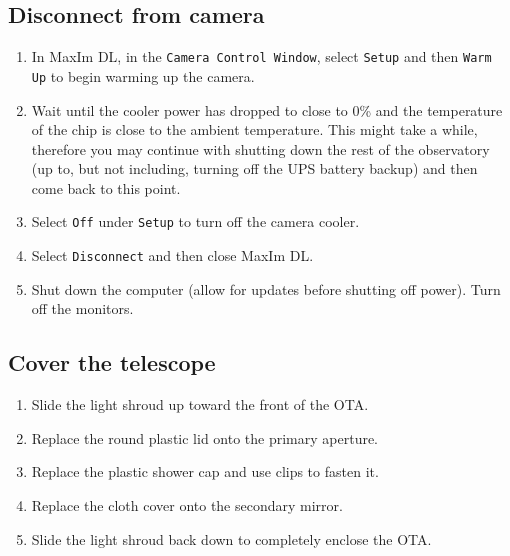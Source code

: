 \documentclass{article}
\begin{document}
	\subsection{Disconnect from camera}
		
		\begin{enumerate}
			
			\item In MaxIm DL, in the \texttt{Camera Control Window}, select \texttt{Setup} and then \texttt{Warm Up} to begin warming up the camera.
			
			\item Wait until the cooler power has dropped to close to 0\% and the temperature of the chip is close to the ambient temperature. This might take a while, therefore you may continue with shutting down the rest of the observatory (up to, but not including, turning off the UPS battery backup) and then come back to this point.
			
			\item Select \texttt{Off} under \texttt{Setup} to turn off the camera cooler.
			
			\item Select \texttt{Disconnect} and then close MaxIm DL.
			
			\item Shut down the computer (allow for updates before shutting off power). Turn off the monitors.
			
		\end{enumerate}
		
	\subsection{Cover the telescope}
		
		\begin{enumerate}
				
			\item Slide the light shroud up toward the front of the OTA.
			
			\item Replace the round plastic lid onto the primary aperture.
			
			\item Replace the plastic shower cap and use clips to fasten it.
			
			\item Replace the cloth cover onto the secondary mirror.
			
			\item Slide the light shroud back down to completely enclose the OTA.
			
		\end{enumerate}
		
\end{document}
